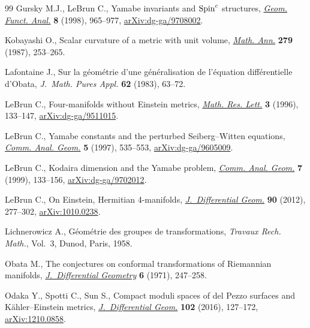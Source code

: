 \begin{thebibliography}{99}
Gursky M.J., LeBrun C., Yamabe invariants and {${\rm Spin}^c$} structures,
 \href{https://doi.org/10.1007/s000390050120}{\textit{Geom. Funct. Anal.}} \textbf{8} (1998), 965--977,
 \href{https://arxiv.org/abs/dg-ga/9708002}{arXiv:dg-ga/9708002}.

Kobayashi O., Scalar curvature of a metric with unit volume, \href{https://doi.org/10.1007/BF01461722}{\textit{Math.
 Ann.}} \textbf{279} (1987), 253--265.

Lafontaine J., Sur la g\'eom\'etrie d'une g\'en\'eralisation de l'\'equation
 diff\'erentielle d'{O}bata, \textit{J.~Math. Pures Appl.} \textbf{62} (1983),
 63--72.

LeBrun C., Four-manifolds without {E}instein metrics, \href{https://doi.org/10.4310/MRL.1996.v3.n2.a1}{\textit{Math. Res. Lett.}}
 \textbf{3} (1996), 133--147, \href{https://arxiv.org/abs/dg-ga/9511015}{arXiv:dg-ga/9511015}.

LeBrun C., Yamabe constants and the perturbed {S}eiberg--{W}itten equations,
 \href{https://doi.org/10.4310/CAG.1997.v5.n3.a6}{\textit{Comm. Anal. Geom.}} \textbf{5} (1997), 535--553,
 \href{https://arxiv.org/abs/dg-ga/9605009}{arXiv:dg-ga/9605009}.

LeBrun C., Kodaira dimension and the {Y}amabe problem, \href{https://doi.org/10.4310/CAG.1999.v7.n1.a5}{\textit{Comm. Anal.
 Geom.}} \textbf{7} (1999), 133--156, \href{https://arxiv.org/abs/dg-ga/9702012}{arXiv:dg-ga/9702012}.

LeBrun C., On {E}instein, {H}ermitian 4-manifolds, \href{https://doi.org/10.4310/jdg/1335230848}{\textit{J.~Differential
 Geom.}} \textbf{90} (2012), 277--302, \href{https://arxiv.org/abs/1010.0238}{arXiv:1010.0238}.

Lichnerowicz A., G\'eom\'etrie des groupes de transformations, \textit{Travaux
 Rech. Math.}, Vol.~3, Dunod, Paris, 1958.

Obata M., The conjectures on conformal transformations of {R}iemannian
 manifolds, \href{https://doi.org/10.4310/jdg/1214430407}{\textit{J.~Differential Geometry}} \textbf{6} (1971), 247--258.

Odaka Y., Spotti C., Sun S., Compact moduli spaces of del {P}ezzo surfaces and
 {K}\"ahler--{E}instein metrics, \href{https://doi.org/10.4310/jdg/1452002879}{\textit{J.~Differential Geom.}} \textbf{102}
 (2016), 127--172, \href{https://arxiv.org/abs/1210.0858}{arXiv:1210.0858}.


\end{thebibliography}
